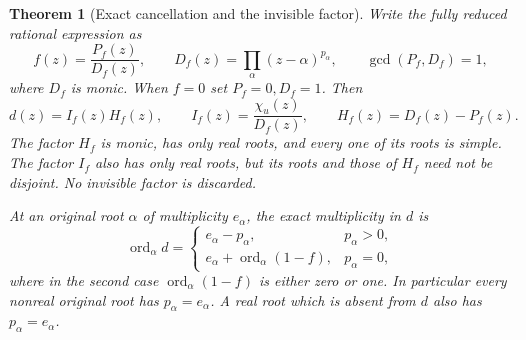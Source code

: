 \documentclass[11pt]{article}
\newcommand{\ord}{\operatorname{ord}}
\newtheorem{theorem}{Theorem}[section]
\begin{document}
\begin{theorem}[Exact cancellation and the invisible factor]
\label{thm:cancellation}
Write the fully reduced rational expression as
\begin{equation}\tag{NS16}\label{NS16}
f(z)=\frac{P_f(z)}{D_f(z)},\qquad
D_f(z)=\prod_\alpha(z-\alpha)^{p_\alpha},\qquad
\gcd(P_f,D_f)=1,
\end{equation}
where $D_f$ is monic. When $f=0$ set $P_f=0,D_f=1$.
Then
\begin{equation}\tag{NS17}\label{NS17}
d(z)=I_f(z)H_f(z),\qquad
I_f(z)=\frac{\chi_u(z)}{D_f(z)},\qquad
H_f(z)=D_f(z)-P_f(z).
\end{equation}
The factor $H_f$ is monic, has only real roots, and every
one of its roots is simple. The factor $I_f$ also has only
real roots, but its roots and those of $H_f$ need not be
disjoint. No invisible factor is discarded.

At an original root $\alpha$ of multiplicity $e_\alpha$,
the exact multiplicity in $d$ is
\begin{equation}\tag{NS18}\label{NS18}
\ord_\alpha d=
\begin{cases}
e_\alpha-p_\alpha,&p_\alpha>0,\\
e_\alpha+\ord_\alpha(1-f),&p_\alpha=0,
\end{cases}
\end{equation}
where in the second case $\ord_\alpha(1-f)$ is either
zero or one. In particular every nonreal original root
has $p_\alpha=e_\alpha$. A real root which is absent from
$d$ also has $p_\alpha=e_\alpha$.
\end{theorem}
\end{document}
